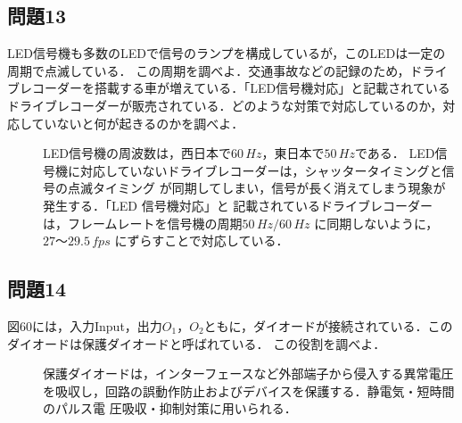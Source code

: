 \newpage

\subsection*{問題13}
LED信号機も多数のLEDで信号のランプを構成しているが，このLEDは一定の周期で点滅している．
この周期を調べよ．交通事故などの記録のため，ドライブレコーダーを搭載する車が増えている．「LED信号機対応」と記載されている
ドライブレコーダーが販売されている．どのような対策で対応しているのか，対応していないと何が起きるのかを調べよ．
\begin{description}
    \item[] LED信号機の周波数は，西日本で$60\,\si{Hz}$，東日本で$50\,\si{Hz}$である．
    LED信号機に対応していないドライブレコーダーは，シャッタータイミングと信号の点滅タイミング
    が同期してしまい，信号が長く消えてしまう現象が発生する．「LED 信号機対応」と
    記載されているドライブレコーダーは，フレームレートを信号機の周期$50\,\si{Hz}/60\,\si{Hz}$
    に同期しないように，$27～29.5\,\si{fps}$ にずらすことで対応している．
\end{description}

\subsection*{問題14}
図60には，入力Input，出力$O_1，O_2$ともに，ダイオードが接続されている．このダイオードは保護ダイオードと呼ばれている．
この役割を調べよ．
\begin{description}
    \item[] 保護ダイオードは，インターフェースなど外部端子から侵入する異常電圧
    を吸収し，回路の誤動作防止およびデバイスを保護する．静電気・短時間のパルス電
    圧吸収・抑制対策に用いられる．
\end{description}

\newpage
